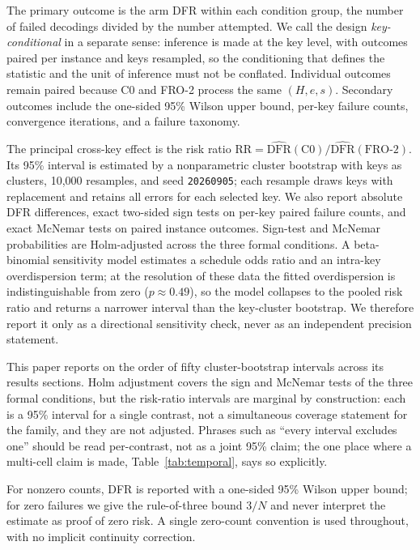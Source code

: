 \documentclass[lettersize,journal]{IEEEtran}
\begin{document}
The primary outcome is the arm DFR within each condition group, the number of failed decodings divided by the number attempted. We call the design \emph{key-conditional} in a separate sense: inference is made at the key level, with outcomes paired per instance and keys resampled, so the conditioning that defines the statistic and the unit of inference must not be conflated. Individual outcomes remain paired because C0 and FRO-2 process the same $(H,e,s)$. Secondary outcomes include the one-sided 95\% Wilson upper bound, per-key failure counts, convergence iterations, and a failure taxonomy.

The principal cross-key effect is the risk ratio $\mathrm{RR}=\widehat{\mathrm{DFR}}(\mathrm{C0})/\widehat{\mathrm{DFR}}(\mathrm{FRO\text{-}2})$. Its 95\% interval is estimated by a nonparametric cluster bootstrap with keys as clusters, 10{,}000 resamples, and seed \texttt{20260905}; each resample draws keys with replacement and retains all errors for each selected key. We also report absolute DFR differences, exact two-sided sign tests on per-key paired failure counts, and exact McNemar tests on paired instance outcomes. Sign-test and McNemar probabilities are Holm-adjusted across the three formal conditions. A beta-binomial sensitivity model estimates a schedule odds ratio and an intra-key overdispersion term; at the resolution of these data the fitted overdispersion is indistinguishable from zero ($p\approx0.49$), so the model collapses to the pooled risk ratio and returns a narrower interval than the key-cluster bootstrap. We therefore report it only as a directional sensitivity check, never as an independent precision statement.

This paper reports on the order of fifty cluster-bootstrap intervals across its results sections. Holm adjustment covers the sign and McNemar tests of the three formal conditions, but the risk-ratio intervals are marginal by construction: each is a 95\% interval for a single contrast, not a simultaneous coverage statement for the family, and they are not adjusted. Phrases such as ``every interval excludes one'' should be read per-contrast, not as a joint 95\% claim; the one place where a multi-cell claim is made, Table~\ref{tab:temporal}, says so explicitly.

For nonzero counts, DFR is reported with a one-sided 95\% Wilson upper bound; for zero failures we give the rule-of-three bound $3/N$ and never interpret the estimate as proof of zero risk. A single zero-count convention is used throughout, with no implicit continuity correction.
\end{document}
